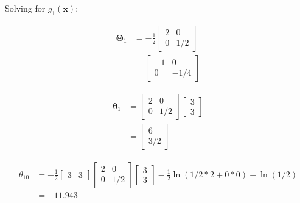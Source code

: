 \documentclass{homeworg}
\begin{document}
Solving for $g_1(\bm{x})$:

\begin{equation}
    \begin{aligned}
        \bm{\Theta}_1 &= -\frac{1}{2}
        \begin{bmatrix}
            2 & 0 \\
            0 & 1/2
        \end{bmatrix}
        \\ &=
        \begin{bmatrix}
            -1 & 0 \\
            0 & -1/4
        \end{bmatrix}
    \end{aligned}
\end{equation}

\begin{equation}
    \begin{aligned}
        \bm{\theta}_1 &=
        \begin{bmatrix}
            2 & 0 \\
            0 & 1/2
        \end{bmatrix}
        \begin{bmatrix}
            3 \\ 3
        \end{bmatrix}
        \\ &=
        \begin{bmatrix}
            6 \\
            3/2
        \end{bmatrix}
    \end{aligned}
\end{equation}

\begin{equation}
    \begin{aligned}
        {\theta}_{10} &=
        -\frac{1}{2}
        \begin{bmatrix}
            3 & 3
        \end{bmatrix}
        \begin{bmatrix}
            2 & 0 \\ 0 & 1/2
        \end{bmatrix}
        \begin{bmatrix}
            3 \\ 3
        \end{bmatrix}
        -\frac{1}{2}\ln(1/2*2+0*0)+\ln(1/2)
        \\ &= -11.943
    \end{aligned}
\end{equation}
\end{document}
